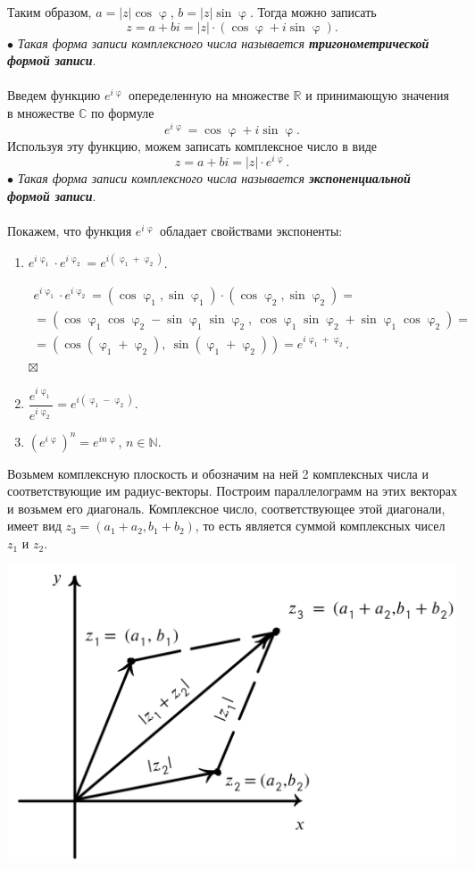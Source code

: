 \documentclass[a4paper, 12pt]{article}
\newenvironment{Proof} %
{\par\noindent{$\blacklozenge$}} %
{\hfill$\scriptstyle\boxtimes$}
\newcommand{\Rm}{\mathbb{R}}
\newcommand{\Cm}{\mathbb{C}}
\newcommand{\N}{\mathbb{N}}
\renewcommand{\varphi}{\upvarphi}
\newcommand\ef[1]{e^{i#1}}
\begin{document}
Таким образом, $a = |z|\cos \varphi$, $b = |z|\sin\varphi$. Тогда можно записать $$z = a + bi = |z|\cdot (\cos \varphi + i\sin\varphi).$$
$\bullet$ \textit{Такая форма записи комплексного числа называется \textbf{тригонометрической формой записи}}.\\\\
Введем функцию $e^{i\varphi}$ опеределенную на множестве $\Rm$ и принимающую значения в множестве $\Cm$ по формуле $$e^{i\varphi} = \cos\varphi + i\sin\varphi.$$
Используя эту функцию, можем записать комплексное число в виде $$z = a+bi = |z|\cdot e^{i\varphi}.$$
$\bullet$ \textit{Такая форма записи комплексного числа называется \textbf{экспоненциальной формой записи}}.\\\\
Покажем, что функция $e^{i\varphi}$ обладает свойствами экспоненты:
\begin{enumerate}
	\item $\ef{\varphi_1}\cdot \ef{\varphi_2} = \ef{(\varphi_1 + \varphi_2)}$.
	\begin{Proof}
		\begin{multline*}
			\ef{\varphi_1}\cdot \ef{\varphi_2} = (\cos\varphi_1, \sin\varphi_1)\cdot (\cos\varphi_2, \sin\varphi_2) =\\= (\cos\varphi_1\cos\varphi_2-\sin\varphi_1\sin\varphi_2,\ \cos\varphi_1\sin\varphi_2 + \sin\varphi_1\cos\varphi_2)=\\=(\cos(\varphi_1 + \varphi_2),\ \sin(\varphi_1 + \varphi_2)) = \ef{\varphi_1 + \varphi_2}.
		\end{multline*}
	\end{Proof}
\item $\dfrac{\ef{\varphi_1}}{\ef{\varphi_2}} = \ef{(\varphi_1 - \varphi_2)}.$
\item $(\ef{\varphi})^n = \ef{n\varphi}$, $n\in \N$.
\end{enumerate}
\noindent
\parbox[b][4cm][t]{90mm}{
	Возьмем комплексную плоскость и обозначим на ней 2 комплексных числа и соответствующие им радиус-векторы. Построим параллелограмм на этих векторах и возьмем его диагональ. Комплексное число, соответствующее этой диагонали, имеет вид $z_3 = (a_1 + a_2, b_1 + b_2)$, то есть является суммой комплексных чисел $z_1$ и $z_2$.
	}
\hfill
\parbox[b][5cm][t]{70mm}{
	\includegraphics[scale=0.36]{images/004.png}}\\\\
\end{document}
